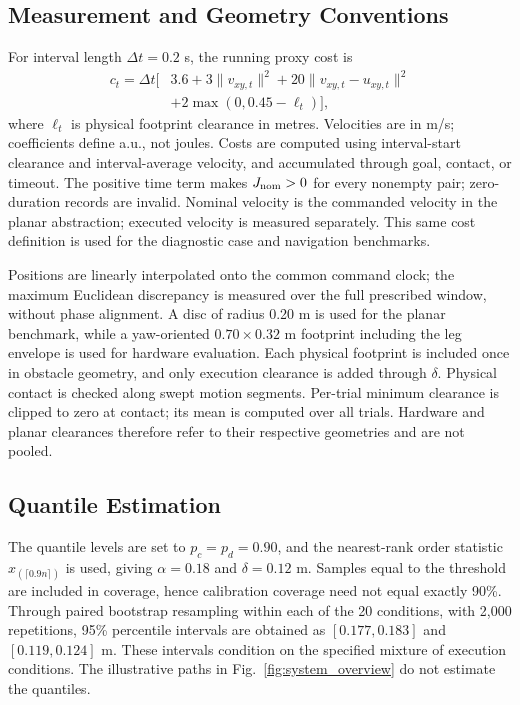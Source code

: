 \documentclass[conference]{IEEEtran}
\begin{document}
\subsection{Measurement and Geometry Conventions}
For interval length $\Delta t=0.2$ s, the running proxy cost is
\begin{equation}
\begin{split}
c_t=\Delta t\big[&3.6+3\|v_{xy,t}\|^2+
20\|v_{xy,t}-u_{xy,t}\|^2\\
&+2\max(0,0.45-\ell_t)\big],
\end{split}
\end{equation}
where $\ell_t$ is physical footprint clearance in metres. Velocities are in
m/s; coefficients define a.u., not joules. Costs are computed using interval-start
clearance and interval-average velocity, and accumulated through goal, contact, or timeout.
The positive time term makes $J_{\rm nom}>0$ for every nonempty pair;
zero-duration records are invalid. Nominal velocity is the commanded velocity
in the planar abstraction; executed velocity is measured separately.
This same cost definition is used for the diagnostic case and navigation benchmarks.

Positions are linearly interpolated onto the common command clock; the maximum
Euclidean discrepancy is measured over the full prescribed window, without phase alignment.
A disc of radius 0.20 m is used for the planar benchmark, while a yaw-oriented
$0.70\times0.32$ m footprint including the leg envelope is used for hardware evaluation.
Each physical footprint is included once in obstacle geometry, and only execution
clearance is added through $\delta$. Physical contact is checked along swept motion
segments. Per-trial minimum clearance is clipped to zero at contact; its mean
is computed over all trials. Hardware and planar clearances therefore refer to their
respective geometries and are not pooled.

\subsection{Quantile Estimation}
The quantile levels are set to $p_c=p_d=0.90$, and the nearest-rank order statistic
$x_{(\lceil0.9n\rceil)}$ is used, giving $\alpha=0.18$ and $\delta=0.12$ m.
Samples equal to the threshold are included in coverage, hence calibration coverage
need not equal exactly 90\%. Through paired bootstrap resampling within each of the
20 conditions, with 2,000 repetitions, 95\% percentile intervals are obtained as
$[0.177,0.183]$ and $[0.119,0.124]$ m. These intervals condition on the specified
mixture of execution conditions. The illustrative paths in
Fig.~\ref{fig:system_overview} do not estimate the quantiles.
\end{document}

